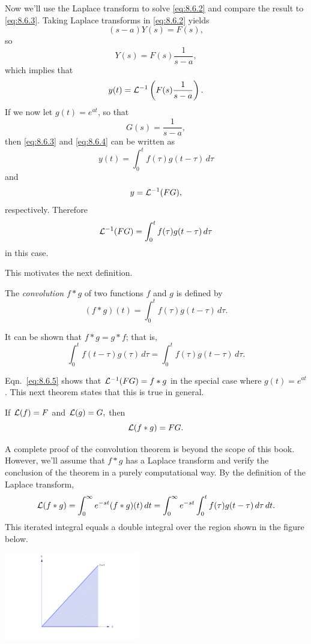 \documentclass{ximera}
\begin{document}
Now we'll use the Laplace transform to solve \eqref{eq:8.6.2}
and compare the result to \eqref{eq:8.6.3}. Taking Laplace transforms in
\eqref{eq:8.6.2} yields
$$
(s-a)Y(s)=F(s),
$$
so
$$
Y(s)=F(s) \frac{1}{s-a},
$$
which implies that
\begin{equation}\label{eq:8.6.4}
y(t)= {\cal L}^{-1}\left(F(s)\frac{1}{s-a}\right).
\end{equation}
If we now let $g(t)=e^{at}$, so that
$$
G(s)=\frac{1}{s-a},
$$
then \eqref{eq:8.6.3} and \eqref{eq:8.6.4} can be written as
$$
y(t)=\int_0^tf(\tau)g(t-\tau)\,d\tau
$$
and
$$
y={\cal L}^{-1}(FG),
$$
respectively.  Therefore
\begin{equation}\label{eq:8.6.5}
{\cal L}^{-1}(FG)=\int_0^t f(\tau)g(t-\tau)\,d\tau
\end{equation}
in this case.

This motivates  the next definition.

\begin{definition}\label{thmtype:8.6.1}
The \textit{convolution} $f\ast g$ of two functions $f$
and $g$ is defined by
$$
(f\ast g)(t)=\int_0^t f(\tau)g(t-\tau)\,d\tau.
$$
\end{definition}

It can be shown %
that $f\ast g=g\ast f$;   that
is,
$$
\int_0^tf(t-\tau)g(\tau)\,d\tau=\int_0^tf(\tau)g(t-\tau)\,d\tau.
$$

Eqn.~\eqref{eq:8.6.5} shows that ${\cal L}^{-1}(FG)=f\ast g$ in the special
case where $g(t)=e^{at}$. This next theorem states that this is
true in general.

\begin{theorem}\label{thmtype:8.6.2}
If ${\cal L}(f)=F$  and ${\cal L}(g)=G,$ then
$$
{\cal L}(f\ast g)=FG.
$$
\end{theorem}

A complete proof of the convolution theorem is beyond the scope of
this book. However, we'll assume that $f\ast g$ has a Laplace
transform and verify the conclusion of the theorem in a purely
computational way. By the definition of the Laplace transform,
$$
{\cal L}(f\ast g)=\int_0^\infty e^{-st}(f\ast g)(t)\,dt=\int_0^\infty
e^{-st}
\int_0^t f(\tau)g(t-\tau)\,d\tau\,dt.
$$
This iterated integral equals a double integral over the region shown
in %
the figure below.

\begin{image}
 \includegraphics[height=1.5in]{fig080601.jpg} 
\end{image}
\end{document}
